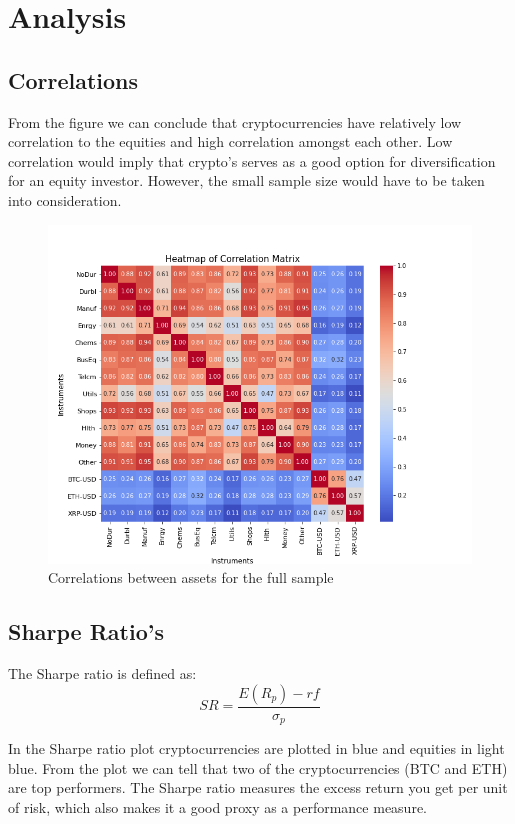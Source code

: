 \documentclass[12pt,a4paper]{article}
\begin{document}
\section{Analysis}\label{sec:analysis}
\subsection{Correlations}

From the figure we can conclude that cryptocurrencies have relatively low correlation to the equities and high correlation 
amongst each other. Low correlation would imply that crypto's serves as a good option for diversification for an equity 
investor. However, the small sample size would have to be taken into consideration. 
\begin{figure}[H]
    \centering
    \includegraphics[width=1\linewidth]{Figures/heatmap_correlation.png}
    \caption{Correlations between assets for the full sample}
    \label{fig:correlations}
\end{figure}

\subsection{Sharpe Ratio's}
The Sharpe ratio is defined as: 
$$SR = \frac{E(R_p)-rf}{\sigma_p}$$

\noindent In the Sharpe ratio plot cryptocurrencies are plotted in blue and equities in light blue. From the plot we can
 tell that two of the cryptocurrencies (BTC and ETH) are top performers. The Sharpe ratio measures the excess return you 
 get per unit of risk, which also makes it a good proxy as a performance measure. 
\end{document}
